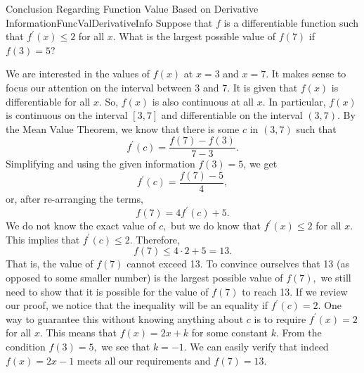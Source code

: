\begin{example}{Conclusion Regarding Function Value Based on Derivative Information}{FuncValDerivativeInfo}
Suppose that $f$ is a differentiable function such that $f^{\prime }\left(
x\right) \leq 2$ for all $x.$ What is the largest possible value of $f\left(
7\right) $ if $f\left( 3\right) =5?$
\end{example}
\begin{solution}
We are interested in the values of $f\left( x\right) $ at $x=3$
and $x=7.$ It makes sense to focus our attention on the interval between 3
and 7. It is given that $f\left( x\right) $ is differentiable for all $x.$
So, $f\left( x\right) $ is also continuous at all $x.$ In particular, $%
f\left( x\right) $ is continuous on the interval $\left[ 3,7\right] $ and
differentiable on the interval $\left( 3,7\right) .$ By the Mean Value
Theorem, we know that there is some $c$ in $\left( 3,7\right) $ such that 
\begin{equation*}
f^{\prime }\left( c\right) =\frac{f\left( 7\right) -f\left( 3\right) }{7-3}.
\end{equation*}%
Simplifying and using the given information $f\left( 3\right) =5$, we get 
\begin{equation*}
f^{\prime }\left( c\right) =\frac{f\left( 7\right) -5}{4},
\end{equation*}%
or, after re-arranging the terms,%
\begin{equation*}
f\left( 7\right) =4f^{\prime }\left( c\right) +5.
\end{equation*}%
We do not know the exact value of $c,$ but we do know that $f^{\prime
}\left( x\right) \leq 2$ for all $x.$ This implies that $f^{\prime }\left(
c\right) \leq 2.$ Therefore,%
\begin{equation*}
f\left( 7\right) \leq 4\cdot 2+5=13.
\end{equation*}%
That is, the value of $f\left( 7\right) $ cannot exceed 13. To convince
ourselves that 13 (as opposed to some smaller number) is the largest
possible value of $f\left( 7\right) ,$ we still need to show that it is
possible for the value of $f\left( 7\right) $ to reach 13. If we review our
proof, we notice that the inequality will be an equality if $f^{\prime
}\left( c\right) =2.$ One way to guarantee this without knowing anything
about $c$ is to require $f^{\prime }\left( x\right) =2$ for all $x.$ This
means that $f\left( x\right) =2x+k$ for some constant $k.$ From the
condition $f\left( 3\right) =5,$ we see that $k=-1.$ We can easily verify
that indeed $f\left( x\right) =2x-1$ meets all our requirements and $f\left(
7\right) =13$.
\end{solution}


